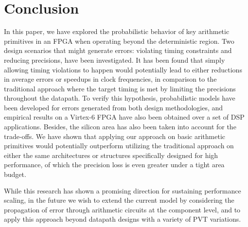 \documentclass[prodmode,acmtrets]{acmsmall} %
\begin{document}
\section{Conclusion}  \label{Section_Conclusion}
In this paper, we have explored the probabilistic behavior of key arithmetic primitives in an FPGA when operating beyond the deterministic region. Two design scenarios that might generate errors: violating timing constraints and reducing precisions, have been investigated. It has been found that simply allowing timing violations to happen would potentially lead to either reductions in average errors or speedups in clock frequencies, in comparison to the traditional approach where the target timing is met by limiting the precisions throughout the datapath. To verify this hypothesis, probabilistic models have been developed for errors generated from both design methodologies, and empirical results on a Virtex-6 FPGA have also been obtained over a set of DSP applications. Besides, the silicon area has also been taken into account for the trade-offs. We have shown that applying our approach on basic arithmetic primitives would potentially outperform utilizing the traditional approach on either the same architectures or structures specifically designed for high performance, of which the precision loss is even greater under a tight area budget.

While this research has shown a promising direction for sustaining performance scaling, in the future we wish to extend the current model by considering the propagation of error through arithmetic circuits at the component level, and to apply this approach beyond datapath designs with a variety of PVT variations.

\end{document}
